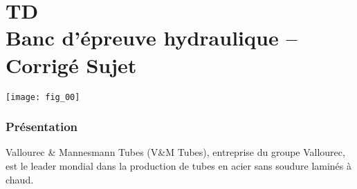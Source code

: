 \chapter*{TD  \\ 
Banc d’épreuve hydraulique -- 
\ifprof Corrigé \else Sujet \fi}

\iflivret {} \else
\ifprof  {} \else \fi
\fi

\setcounter{question}{0}

\begin{marginfigure} [4cm]
\centering
\texttt{[image: fig\_00]}
\end{marginfigure}



\subsection*{Présentation}
\ifprof
\else
Vallourec \& Mannesmann Tubes (V\&M Tubes), entreprise du groupe Vallourec, est le leader mondial dans la production de tubes en acier sans soudure laminés à chaud. %

